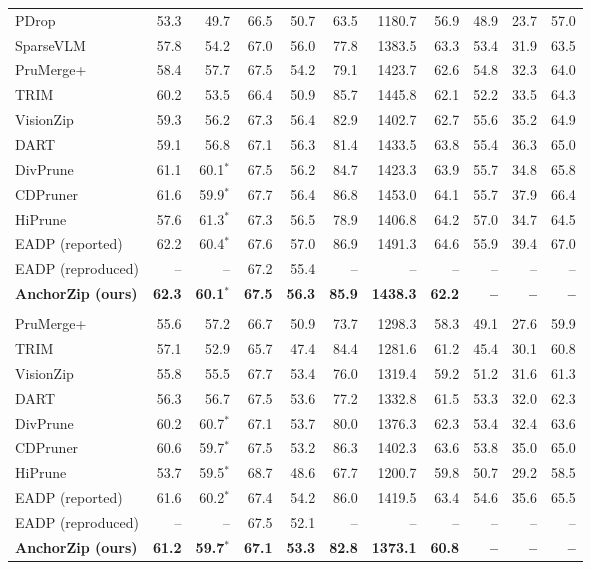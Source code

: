 \documentclass[10pt,a4paper]{article}
\begin{document}
{\begin{tabular}{lrrrrrrrrrr}
PDrop & 53.3 & 49.7 & 66.5 & 50.7 & 63.5 & 1180.7 & 56.9 & 48.9 & 23.7 & 57.0 \\
SparseVLM & 57.8 & 54.2 & 67.0 & 56.0 & 77.8 & 1383.5 & 63.3 & 53.4 & 31.9 & 63.5 \\
PruMerge+ & 58.4 & 57.7 & 67.5 & 54.2 & 79.1 & 1423.7 & 62.6 & 54.8 & 32.3 & 64.0 \\
TRIM & 60.2 & 53.5 & 66.4 & 50.9 & 85.7 & 1445.8 & 62.1 & 52.2 & 33.5 & 64.3 \\
VisionZip & 59.3 & 56.2 & 67.3 & 56.4 & 82.9 & 1402.7 & 62.7 & 55.6 & 35.2 & 64.9 \\
DART & 59.1 & 56.8 & 67.1 & 56.3 & 81.4 & 1433.5 & 63.8 & 55.4 & 36.3 & 65.0 \\
DivPrune & 61.1 & 60.1$^{*}$ & 67.5 & 56.2 & 84.7 & 1423.3 & 63.9 & 55.7 & 34.8 & 65.8 \\
CDPruner & 61.6 & 59.9$^{*}$ & 67.7 & 56.4 & 86.8 & 1453.0 & 64.1 & 55.7 & 37.9 & 66.4 \\
HiPrune & 57.6 & 61.3$^{*}$ & 67.3 & 56.5 & 78.9 & 1406.8 & 64.2 & 57.0 & 34.7 & 64.5 \\
EADP (reported) & 62.2 & 60.4$^{*}$ & 67.6 & 57.0 & 86.9 & 1491.3 & 64.6 & 55.9 & 39.4 & 67.0 \\
EADP (reproduced) & -- & -- & 67.2 & 55.4 & -- & -- & -- & -- & -- & -- \\
\textbf{AnchorZip (ours)} & \textbf{62.3} & \textbf{60.1$^{*}$} & \textbf{67.5} & \textbf{56.3} & \textbf{85.9} & \textbf{1438.3} & \textbf{62.2} & \textbf{--} & \textbf{--} & \textbf{--} \\
\rowcolor{black!12}\multicolumn{11}{c}{\textit{Retain 160 tokens (nominal)}} \\
PruMerge+ & 55.6 & 57.2 & 66.7 & 50.9 & 73.7 & 1298.3 & 58.3 & 49.1 & 27.6 & 59.9 \\
TRIM & 57.1 & 52.9 & 65.7 & 47.4 & 84.4 & 1281.6 & 61.2 & 45.4 & 30.1 & 60.8 \\
VisionZip & 55.8 & 55.5 & 67.7 & 53.4 & 76.0 & 1319.4 & 59.2 & 51.2 & 31.6 & 61.3 \\
DART & 56.3 & 56.7 & 67.5 & 53.6 & 77.2 & 1332.8 & 61.5 & 53.3 & 32.0 & 62.3 \\
DivPrune & 60.2 & 60.7$^{*}$ & 67.1 & 53.7 & 80.0 & 1376.3 & 62.3 & 53.4 & 32.4 & 63.6 \\
CDPruner & 60.6 & 59.7$^{*}$ & 67.5 & 53.2 & 86.3 & 1402.3 & 63.6 & 53.8 & 35.0 & 65.0 \\
HiPrune & 53.7 & 59.5$^{*}$ & 68.7 & 48.6 & 67.7 & 1200.7 & 59.8 & 50.7 & 29.2 & 58.5 \\
EADP (reported) & 61.6 & 60.2$^{*}$ & 67.4 & 54.2 & 86.0 & 1419.5 & 63.4 & 54.6 & 35.6 & 65.5 \\
EADP (reproduced) & -- & -- & 67.5 & 52.1 & -- & -- & -- & -- & -- & -- \\
\textbf{AnchorZip (ours)} & \textbf{61.2} & \textbf{59.7$^{*}$} & \textbf{67.1} & \textbf{53.3} & \textbf{82.8} & \textbf{1373.1} & \textbf{60.8} & \textbf{--} & \textbf{--} & \textbf{--} \\
\bottomrule\end{tabular}}\endgroup\par\medskip
\end{document}
